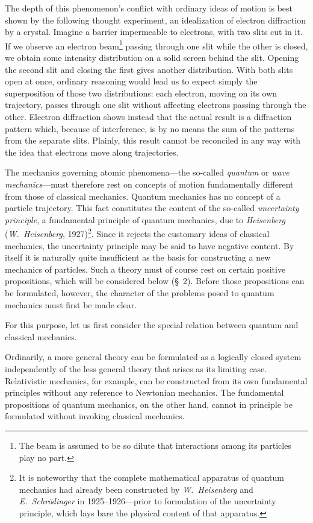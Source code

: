 The depth of this phenomenon's conflict with ordinary ideas of motion is best
shown by the following thought experiment, an idealization of electron
diffraction by a crystal. Imagine a barrier impermeable to electrons, with two
slits cut in it. If we observe an electron beam\footnote{The beam is assumed
to be so dilute that interactions among its particles play no part.} passing
through one slit while the other is closed, we obtain some intensity
distribution on a solid screen behind the slit. Opening the second slit and
closing the first gives another distribution. With both slits open at once,
ordinary reasoning would lead us to expect simply the superposition of those
two distributions: each electron, moving on its own trajectory, passes
through one slit without affecting electrons passing through the other.
Electron diffraction shows instead that the actual result is a diffraction
pattern which, because of interference, is by no means the sum of the patterns
from the separate slits. Plainly, this result cannot be reconciled in any way
with the idea that electrons move along trajectories.

The mechanics governing atomic phenomena---the so-called \emph{quantum} or
\emph{wave mechanics}---must therefore rest on concepts of motion fundamentally
different from those of classical mechanics. Quantum mechanics has no concept
of a particle trajectory. This fact constitutes the content of the so-called
\emph{uncertainty principle}, a fundamental principle of quantum
mechanics, due to \emph{Heisenberg} (\emph{W.~Heisenberg},
1927)\footnote{It is noteworthy that the complete mathematical apparatus of
quantum mechanics had already been constructed by \emph{W.~Heisenberg} and
\emph{E.~Schrödinger} in 1925--1926---prior to formulation of the uncertainty
principle, which lays bare the physical content of that apparatus.}. Since it
rejects the customary ideas of classical mechanics, the uncertainty principle
may be said to have negative content. By itself it is naturally quite
insufficient as the basis for constructing a new mechanics of particles. Such
a theory must of course rest on certain positive propositions, which will be
considered below (\S~2). Before those propositions can be formulated, however,
the character of the problems posed to quantum mechanics must first be made
clear.

For this purpose, let us first consider the special relation between quantum
and classical mechanics.

Ordinarily, a more general theory can be formulated as a logically closed
system independently of the less general theory that arises as its limiting
case. Relativistic mechanics, for example, can be constructed from its own
fundamental principles without any reference to Newtonian mechanics. The
fundamental propositions of quantum mechanics, on the other hand, cannot in
principle be formulated without invoking classical mechanics.


